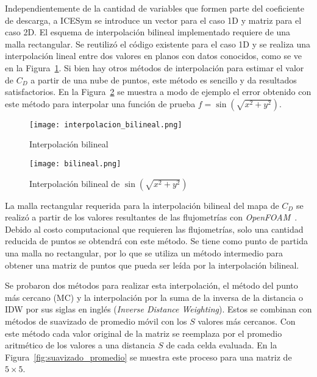 
Independientemente de la cantidad de variables que formen parte del coeficiente
de descarga, a ICESym se introduce un vector para el caso 1D y matriz para el
caso 2D.
%
El esquema de interpolación bilineal implementado requiere de una malla
rectangular.
%
Se reutilizó el código existente para el caso 1D y se realiza una interpolación
lineal entre dos valores en planos con datos conocidos, como se ve en la
Figura~\ref{fig:interp_bilineal}.
%
Si bien hay otros métodos de interpolación para estimar el valor de $C_D$ a
partir de una nube de puntos, este método es sencillo y da resultados
satisfactorios.
%
En la Figura~\ref{fig:bilineal} se muestra a modo de ejemplo el error obtenido
con este método para interpolar una función de prueba
$f=\sin\left(\sqrt{x^2 + y^2}\right)$.

\begin{figure}
    \centering
    \texttt{[image: interpolacion\_bilineal.png]}
    \caption{Interpolación bilineal\protect\footnotemark}\label{fig:interp_bilineal}
\end{figure}

\begin{figure}
    \centering
    \texttt{[image: bilineal.png]}
    \caption{Interpolación bilineal de $\sin(\sqrt{x^2 + y^2})$}\label{fig:bilineal}
\end{figure}

La malla rectangular requerida para la interpolación bilineal del mapa de
$C_{D}$ se realizó a partir de los valores resultantes de las flujometrías con
\emph{OpenFOAM}~\parencite{openfoam}.
%
Debido al costo computacional que requieren las flujometrías, solo una cantidad
reducida de puntos se obtendrá con este método.
%
Se tiene como punto de partida una malla no rectangular, por lo que se utiliza
un método intermedio para obtener una matriz de puntos que pueda ser leída por
la interpolación bilineal.

Se probaron dos métodos para realizar esta interpolación, el método del punto más
cercano (MC) y la interpolación por la suma de la inversa de la distancia o IDW por
sus siglas en inglés (\emph{Inverse Distance Weighting}).
%
Estos se combinan con métodos de suavizado de promedio móvil con los $S$ valores
más cercanos.
%
Con este método cada valor original de la matriz se reemplaza por el promedio
aritmético de los valores a una distancia $S$ de cada celda evaluada.
%
En la Figura~\ref{fig:suavizado_promedio} se muestra este proceso para una
matriz de $5\times5$.

